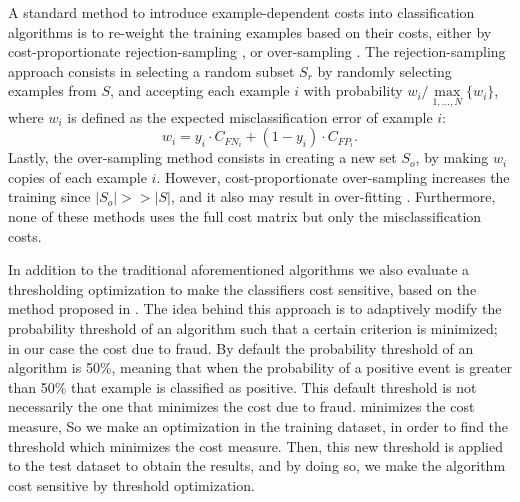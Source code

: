     A standard method to introduce example-dependent costs into classification algorithms is to 
    re-weight the training examples based on their costs, either by cost-proportionate 
    rejection-sampling \citep{Zadrozny2003}, or over-sampling \citep{Elkan2001}. The 
    rejection-sampling approach consists in selecting a random subset $S_{r}$  by randomly 
    selecting examples from $S$, and accepting each example $i$ with probability $w_i/ 
    \max\limits_{1,\dots, N}\{w_i\}$, where $w_i$ is defined as the expected misclassification 
    error of example $i$:
    \begin{equation}\label{eq_pred1}
      w_i = y_i\cdot C_{FN_i}+(1-y_i)\cdot C_{FP_i}.
    \end{equation}
    Lastly, the over-sampling method consists in creating a new set $S_{o}$, by making $w_i$ 
    copies of each example $i$. However, cost-proportionate over-sampling increases the training 
    since $\vert S_{o}\vert >> \vert S \vert$, and it also may result in over-fitting 
    \citep{Drummond2003}. Furthermore, none of these methods uses the full cost matrix but only the 
    misclassification costs.

In addition to the traditional aforementioned algorithms we also evaluate a thresholding 
optimization to make the 
   classifiers cost sensitive, based on the method proposed in \cite{Sheng2006}.
   The idea behind this approach is to adaptively modify the probability threshold of an 
   algorithm such that a certain criterion is minimized; in our case the cost due to fraud.
   By default the probability threshold of an algorithm is 50\%, meaning that when the probability 
   of a positive event is greater than 50\% that example is classified as positive.
   This default threshold is not necessarily the one that minimizes the cost due to fraud. 
minimizes the cost measure,
   So we make an optimization in the training dataset, in order to find the threshold which 
minimizes the cost measure.
   Then, this new threshold is applied to the test dataset to obtain the results,
   and by doing so, we make the algorithm cost sensitive by threshold optimization.